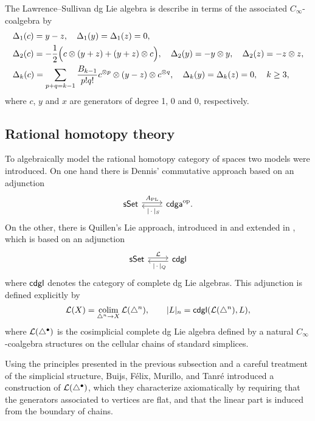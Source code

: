 The Lawrence--Sullivan dg Lie algebra is describe in terms of the associated $C_\infty$-coalgebra by
\begin{align*}
& \Delta_1(c) = y-z, \quad
\Delta_1(y) = \Delta_1(z) = 0, \\
& \Delta_2(c) = -\frac{1}{2} \Big( c \otimes (y+z) + (y+z) \otimes c \Big), \quad
\Delta_2(y) = -y \otimes y, \quad
\Delta_2(z) = -z \otimes z, \\
& \Delta_k(c) = \sum_{p+q=k-1} \frac{B_{k-1}}{p!q!} c^{\otimes p} \otimes (y-z) \otimes c^{\otimes q}, \quad
\Delta_k(y) = \Delta_k(z) = 0, \quad k \geq 3,
\end{align*}
where $c$, $y$ and $x$ are generators of degree 1, 0 and 0, respectively.

\subsection{Rational homotopy theory} \label{ss:cdgl model}

To algebraically model the rational homotopy category of spaces two models were introduced.
On one hand there is Dennis' commutative approach \cite{sullivan1977infinitesimal} based on an adjunction
\[
\begin{tikzcd}
\sSet \arrow[r, shift left=2pt, "A_{\mathrm{PL}}"] &
\cdga^\op \arrow[l, shift left=2pt, "\ \bars{\,\cdot\,}_S"].
\end{tikzcd}
\]
On the other, there is Quillen's Lie approach, introduced in \cite{quillen1969rational} and extended in \cite{buijs2013algebraicmodels, buijs2020liemodels}, which is based on an adjunction
\[
\begin{tikzcd}
\sSet \arrow[r, shift left=2pt, "\cL"] &
\cdgl \arrow[l, shift left=2pt, "\ \bars{\,\cdot\,}_Q"]
\end{tikzcd}
\]
where $\mathsf{cdgl}$ denotes the category of complete dg Lie algebras.
This adjunction is defined explicitly by
\[
\mathcal{L}(X) = \operatorname*{colim}_{\triangle^n \to X} \mathcal{L}(\triangle^n), \qquad
\lvert L\rvert_n = \mathsf{cdgl}(\mathcal{L}(\triangle^n), L),
\]
where $\mathcal{L}(\triangle^\bullet)$ is the cosimplicial complete dg Lie algebra defined by a natural $C_\infty$-coalgebra structures on the cellular chains of standard simplices.

Using the principles presented in the previous subsection and a careful treatment of the simplicial structure, Buijs, F{\'e}lix, Murillo, and Tanr{\'e} \cite{buijs2020liemodels} introduced a construction of $\mathcal{L}(\triangle^\bullet)$, which they characterize axiomatically by requiring that the generators associated to vertices are flat, and that the linear part is induced from the boundary of chains.


